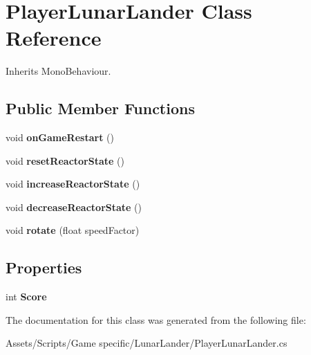 \hypertarget{class_player_lunar_lander}{\section{Player\-Lunar\-Lander Class Reference}
\label{class_player_lunar_lander}
}


Inherits Mono\-Behaviour.

\subsection*{Public Member Functions}
\begin{DoxyCompactItemize}
\item 
\hypertarget{class_player_lunar_lander_ad4ea19171cdddf20814e06cd0bee64ad}{void {\bfseries on\-Game\-Restart} ()}\label{class_player_lunar_lander_ad4ea19171cdddf20814e06cd0bee64ad}

\item 
\hypertarget{class_player_lunar_lander_a1e6f764183026874fa7bafad3bf88ce9}{void {\bfseries reset\-Reactor\-State} ()}\label{class_player_lunar_lander_a1e6f764183026874fa7bafad3bf88ce9}

\item 
\hypertarget{class_player_lunar_lander_a644707ff104b1bc772236c9685f028fc}{void {\bfseries increase\-Reactor\-State} ()}\label{class_player_lunar_lander_a644707ff104b1bc772236c9685f028fc}

\item 
\hypertarget{class_player_lunar_lander_a8f49100c51e26215d790b3623dce2594}{void {\bfseries decrease\-Reactor\-State} ()}\label{class_player_lunar_lander_a8f49100c51e26215d790b3623dce2594}

\item 
\hypertarget{class_player_lunar_lander_a42a9b8b48b9a1e4da8d831b00f2bec56}{void {\bfseries rotate} (float speed\-Factor)}\label{class_player_lunar_lander_a42a9b8b48b9a1e4da8d831b00f2bec56}

\end{DoxyCompactItemize}
\subsection*{Properties}
\begin{DoxyCompactItemize}
\item 
\hypertarget{class_player_lunar_lander_aa7e0784cd7e0345a256f90c78d31b454}{int {\bfseries Score}}\label{class_player_lunar_lander_aa7e0784cd7e0345a256f90c78d31b454}

\end{DoxyCompactItemize}


The documentation for this class was generated from the following file\-:\begin{DoxyCompactItemize}
\item 
Assets/\-Scripts/\-Game specific/\-Lunar\-Lander/Player\-Lunar\-Lander.\-cs\end{DoxyCompactItemize}
